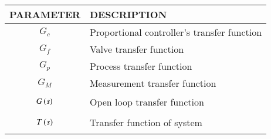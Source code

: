 \begin{tabular}{|p{2cm}|p{6cm}|}
    \hline
    PARAMETER & DESCRIPTION \\ \hline
    $$G_c$$ & Proportional controller's transfer function \\ \hline
    $$G_f$$ & Valve transfer function \\ \hline
    $$G_p$$ & Process transfer function   \\ \hline
    $$G_M$$ & Measurement transfer function \\ \hline 
    $$G\left(s\right)$$ & Open loop transfer function \\ \hline
    $$T\left(s\right)$$ & Transfer function of system \\ \hline
\end{tabular}
